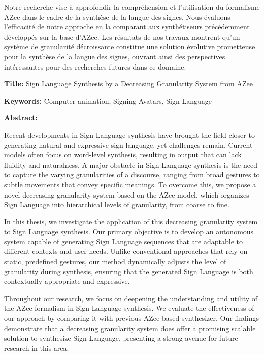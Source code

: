 \documentclass[english,12pt,a4paper]{book}
\begin{document}
\begin{mdframed}[linecolor=Prune,linewidth=1]
\begin{multicols}{2}
Notre recherche vise à approfondir la compréhension et l'utilisation du formalisme AZee dans le cadre de la synthèse de la langue des signes. Nous évaluons l'efficacité de notre approche en la comparant aux synthétiseurs précédemment développés sur la base d'AZee. Les résultats de nos travaux montrent qu’un système de granularité décroissante constitue une solution évolutive prometteuse pour la synthèse de la langue des signes, ouvrant ainsi des perspectives intéressantes pour des recherches futures dans ce domaine.
\end{multicols}

\end{mdframed}

\newpage

\vspace{8mm}

\begin{mdframed}[linecolor=Prune,linewidth=1]

\textbf{Title:} Sign Language Synthesis by a Decreasing Granularity System from AZee

\noindent \textbf{Keywords:} Computer animation, Signing Avatars, Sign Language

\begin{multicols}{2}
\noindent \textbf{Abstract:}

Recent developments in Sign Language synthesis have brought the field closer to generating natural and expressive sign language, yet challenges remain. Current models often focus on word-level synthesis, resulting in output that can lack fluidity and naturalness. A major obstacle in Sign Language synthesis is the need to capture the varying granularities of a discourse, ranging from broad gestures to subtle movements that convey specific meanings. To overcome this, we propose a novel decreasing granularity system based on the AZee model, which organizes Sign Language into hierarchical levels of granularity, from coarse to fine.

In this thesis, we investigate the application of this decreasing granularity system to Sign Language synthesis. Our primary objective is to develop an autonomous system capable of generating Sign Language sequences that are adaptable to different contexts and user needs. Unlike conventional approaches that rely on static, predefined gestures, our method dynamically adjusts the level of granularity during synthesis, ensuring that the generated Sign Language is both contextually appropriate and expressive.

Throughout our research, we focus on deepening the understanding and utility of the AZee formalism in Sign Language synthesis. We evaluate the effectiveness of our approach by comparing it with previous AZee based synthesizer. Our findings demonstrate that a decreasing granularity system does offer a promising scalable solution to synthesize Sign Language, presenting a strong avenue for future research in this area.

\end{multicols}
\end{mdframed}
\end{document}
